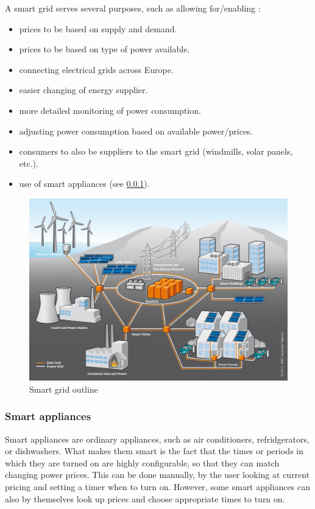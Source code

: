 A smart grid serves several purposes, such as allowing for/enabling \cite{smartgrid_gov, directive_2009_72_EC}:
\begin{itemize}
	\item prices to be based on supply and demand.
	\item prices to be based on type of power available.
	\item connecting electrical grids across Europe.
	\item easier changing of energy supplier.
	\item more detailed monitoring of power consumption.
	\item adjusting power consumption based on available power/prices.
	\item consumers to also be suppliers to the smart grid (windmills, solar panels, etc.).
	\item use of smart appliances (see \cref{background:smart_appliances}).
\end{itemize}

\begin{figure}
	\includegraphics[width=\textwidth]{figures/SmartGrid_Ueberblick_ohneLegende.jpg}
	\caption{Smart grid outline\protect\footnotemark}
	\label{fig:background:smartgrid}
\end{figure}

\subsubsection{Smart appliances}
\label{background:smart_appliances}
Smart appliances\cite{smart_appliances} are ordinary appliances, such as air conditioners, refridgerators, or dishwashers.
What makes them smart is the fact that the times or periods in which they are turned on are highly configurable, so that they can match changing power prices.
This can be done manually, by the user looking at current pricing and setting a timer when to turn on.
However, some smart appliances can also by themselves look up prices and choose appropriate times to turn on.

